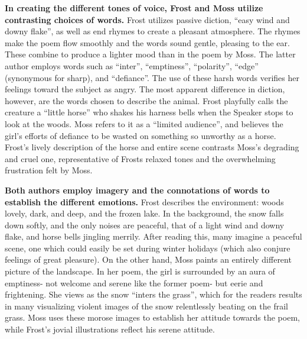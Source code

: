 \begin{enumerate}
\textbf{In creating the different tones of voice, Frost and Moss utilize contrasting choices of words.} Frost utilizes passive diction, “easy wind and downy flake”, as well as end rhymes to create a pleasant atmosphere. The rhymes make the poem flow smoothly and the words sound gentle, pleasing to the ear. These combine to produce a lighter mood than in the poem by Moss. The latter author employs words such as “inter”, “emptiness”, “polarity”, “edge” (synonymous for sharp), and “defiance”. The use of these harsh words verifies her feelings toward the subject as angry. The most apparent difference in diction, however, are the words chosen to describe the animal. Frost playfully calls the creature a “little horse” who shakes his harness bells when the Speaker stops to look at the woods. Moss refers to it as a “limited audience”, and believes the girl's efforts of defiance to be wasted on something so unworthy as a horse. Frost's lively description of the horse and entire scene contrasts Moss's degrading and cruel one, representative of Frosts relaxed tones and the overwhelming frustration felt by Moss. 

\textbf{Both authors employ imagery and the connotations of words to establish the different emotions.} Frost describes the environment: woods lovely, dark, and deep, and the frozen lake. In the background, the snow falls down softly, and the only noises are peaceful, that of a light wind and downy flake, and horse bells jingling merrily. After reading this, many imagine a peaceful scene, one which could easily be set during winter holidays (which also conjure feelings of great pleasure). On the other hand, Moss paints an entirely different picture of the landscape. In her poem, the girl is surrounded by an aura of emptiness- not welcome and serene like the former poem- but eerie and frightening. She views as the snow “inters the grass”, which for the readers results in many visualizing violent images of the snow relentlessly beating on the frail grass. Moss uses these morose images to establish her attitude towards the poem, while Frost's jovial illustrations reflect his serene attitude. 


\end{enumerate}
